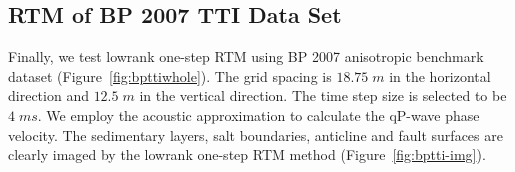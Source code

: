 

\subsection{RTM of BP 2007 TTI Data Set}
Finally, we test lowrank one-step RTM using BP 2007 anisotropic benchmark dataset (Figure~\ref{fig:bpttiwhole}). The grid spacing is $18.75\;m$ in the horizontal direction and $12.5\;m$ in the vertical direction. The time step size is selected to be $4\;ms$. We employ the acoustic approximation \cite[]{tariq98,tariq00,fomel04} to calculate the qP-wave phase velocity.
The sedimentary layers, salt boundaries, anticline and fault surfaces are clearly imaged by the lowrank one-step RTM method (Figure~\ref{fig:bptti-img}).

